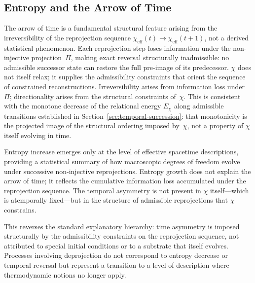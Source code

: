 \subsection{Entropy and the Arrow of Time}
  \label{subsec:entropy-arrow-of-time}

  The arrow of time is a fundamental structural feature arising from the
  irreversibility of the reprojection sequence
  $\chi_{\mathrm{eff}}(t) \to \chi_{\mathrm{eff}}(t+1)$, not a derived statistical phenomenon.
  Each reprojection step loses information under the non-injective
  projection~$\Pi$, making exact reversal structurally inadmissible:
  no admissible successor state can restore the full pre-image of its predecessor.
  $\chi$ does not itself relax; it supplies the admissibility constraints
  that orient the sequence of constrained reconstructions.
  Irreversibility arises from information loss under~$\Pi$; directionality
  arises from the structural constraints of~$\chi$.
  This is consistent with the monotone decrease of the relational
  energy $E_\chi$ along admissible transitions established in
  Section~\ref{sec:temporal-succession}: that monotonicity is the projected image of the
  structural ordering imposed by~$\chi$, not a property of $\chi$ itself evolving in time.

  Entropy increase emerges only at the level of effective spacetime
  descriptions, providing a statistical summary of how macroscopic degrees
  of freedom evolve under successive non-injective reprojections.
  Entropy growth does not explain the arrow of time; it reflects the
  cumulative information loss accumulated under the reprojection sequence.
  The temporal asymmetry is not present in $\chi$ itself---which is
  atemporally fixed---but in the structure of admissible reprojections that $\chi$ constrains.

  This reverses the standard explanatory hierarchy: time asymmetry is
  imposed structurally by the admissibility constraints on the reprojection
  sequence, not attributed to special initial conditions or to a substrate that itself evolves.
  Processes involving deprojection do not correspond to entropy decrease
  or temporal reversal but represent a transition to a level of description
  where thermodynamic notions no longer apply.
